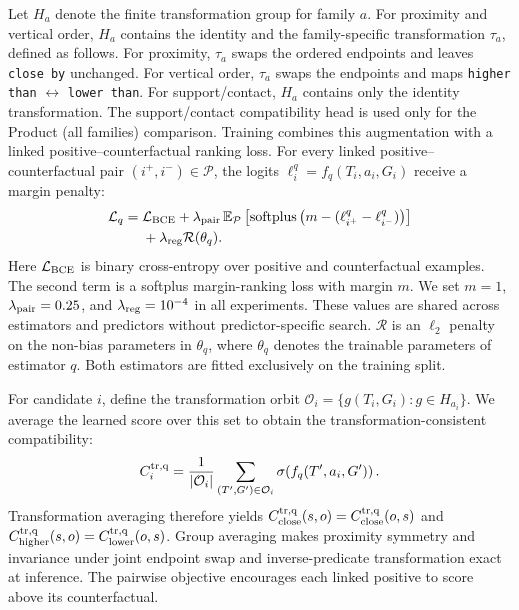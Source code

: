 Let $H_a$ denote the finite transformation group for family $a$. For proximity and vertical order, $H_a$ contains the identity and the family-specific transformation $\tau_a$, defined as follows. For proximity, $\tau_a$ swaps the ordered endpoints and leaves \texttt{close by} unchanged. For vertical order, $\tau_a$ swaps the endpoints and maps \texttt{higher than} $\leftrightarrow$ \texttt{lower than}. For support/contact, $H_a$ contains only the identity transformation. The support/contact compatibility head is used only for the Product (all families) comparison.
Training combines this augmentation with a linked positive--counterfactual ranking loss. For every linked positive--counterfactual pair $(i^+,i^-)\in\mathcal P$, the logits $\ell_i^q=f_q(T_i,a_i,G_i)$ receive a margin penalty:
\begin{equation}
\begin{aligned}
\mathcal L_q={}&\mathcal L_{\rm BCE}
+\lambda_{\rm pair}\,\mathbb E_{\mathcal P}
\left[\operatorname{softplus}
\left(m-(\ell^q_{i^+}-\ell^q_{i^-})\right)\right]\\
&+\lambda_{\rm reg}\mathcal R(\theta_q).
\end{aligned}
\end{equation}
Here $\mathcal L_{\rm BCE}$ is binary cross-entropy over positive and counterfactual examples. The second term is a softplus margin-ranking loss with margin $m$. We set $m=1$, $\lambda_{\rm pair}=0.25$, and $\lambda_{\rm reg}=10^{-4}$ in all experiments. These values are shared across estimators and predictors without predictor-specific search. $\mathcal R$ is an $\ell_2$ penalty on the non-bias parameters in $\theta_q$, where $\theta_q$ denotes the trainable parameters of estimator $q$. Both estimators are fitted exclusively on the training split.

For candidate $i$, define the transformation orbit $\mathcal O_i=\{g(T_i,G_i):g\in H_{a_i}\}$. We average the learned score over this set to obtain the transformation-consistent compatibility:
\begin{equation}
C_i^{\rm tr,q}=\frac{1}{|\mathcal O_i|}
\sum_{(T',G')\in\mathcal O_i} \sigma\!\left(f_q(T',a_i,G')\right).
\label{eq:algebra-projection}
\end{equation}
Transformation averaging therefore yields
$C^{\rm tr,q}_{\rm close}(s,o)=C^{\rm tr,q}_{\rm close}(o,s)$ and
$C^{\rm tr,q}_{\rm higher}(s,o)=C^{\rm tr,q}_{\rm lower}(o,s)$. Group averaging makes proximity symmetry and invariance under joint endpoint swap and inverse-predicate transformation exact at inference. The pairwise objective encourages each linked positive to score above its counterfactual.

